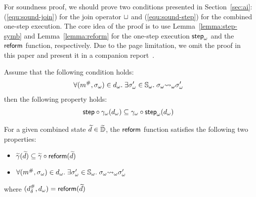 For soundness proof, we should prove 
two conditions presented in Section~\ref{sec:ai}:
(\ref{equ:sound-join}) for the join operator $\sqcup$ and
(\ref{equ:sound-step}) for the combined one-step execution.
The core idea of the proof is to use Lemma~\ref{lemma:step-symb} and
Lemma~\ref{lemma:reform} for the {\sealed} one-step execution
${\textsf{step}}_\omega$ and the $\textsf{reform}$ function, respectively. Due to the page limitation, we omit
the proof in this paper and present it in a companion report~\cite{report}.
\begin{lemma}\label{lemma:step-symb}
  Assume that the following condition holds:
  \[
    \forall ({m}^{\#}, {\sigma}_\omega) \in {{d}_\omega}. \; \exists {\sigma}_\omega' \in
    {\mathbb{S}}_\omega. \; {\sigma}_\omega {\leadsto}_\omega {\sigma}_\omega'
  \]
  then the following property holds:
  \[
    \textsf{step} \circ {\gamma}_\omega({{d}_\omega}) \subseteq
    {\gamma}_\omega \circ {\textsf{step}}_\omega({{d}_\omega})\\
  \]
\end{lemma}
\begin{lemma}\label{lemma:reform}
  For a given combined state $\widetilde{d} \in \widetilde{\mathbb{D}}$, the $\textsf{reform}$ function
  satisfies the following two properties:
  \begin{itemize}
    \item $\widetilde{\gamma}(\widetilde{d}) \subseteq \widetilde{\gamma} \circ \textsf{reform}(\widetilde{d})$
    \item $\forall ({m}^{\#}, {\sigma}_\omega) \in {{d}_\omega}. \; \exists {\sigma}_\omega' \in
      {\mathbb{S}}_\omega.  \; {\sigma}_\omega {\leadsto}_\omega {\sigma}_\omega'$
  \end{itemize}
  where $({{d}^{\#}_\delta}, {{d}_\omega}) = \textsf{reform}(\widetilde{d})$
\end{lemma}
